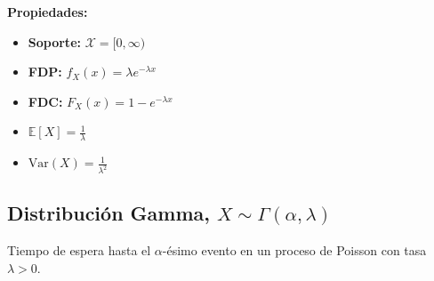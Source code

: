 \vspace{0.8em}
\noindent
\begin{minipage}[c]{0.45\textwidth}
    \textbf{Propiedades:}
    \begin{itemize}\setlength\itemsep{0.3em}
        \item \textbf{Soporte:} $\mathcal{X} = [0, \infty)$
        \item \textbf{FDP:} $f_X(x) = \lambda e^{-\lambda x}$
        \item \textbf{FDC:} $F_X(x) = 1 - e^{-\lambda x}$
        \item $\mathbb{E}[X] = \frac{1}{\lambda}$
        \item $\text{Var}(X) = \frac{1}{\lambda^2}$
    \end{itemize}
\end{minipage}%
\hfill
\begin{minipage}[c]{0.5\textwidth}
    \begin{center}
    \end{center}
\end{minipage}

\vspace{1.5em}

\subsection*{Distribución Gamma, $X \sim \Gamma(\alpha, \lambda)$}
Tiempo de espera hasta el $\alpha$-ésimo evento en un proceso de Poisson con tasa $\lambda > 0$.

